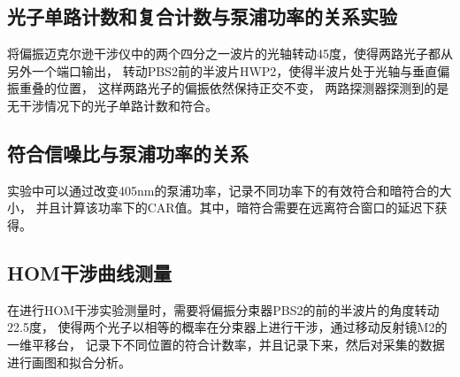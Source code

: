 \documentclass[a4paper,UTF8]{ctexart}
\begin{document}
\subsection{光子单路计数和复合计数与泵浦功率的关系实验}

将偏振迈克尔逊干涉仪中的两个四分之一波片的光轴转动45度，使得两路光子都从另外一个端口输出，
转动PBS2前的半波片HWP2，使得半波片处于光轴与垂直偏振重叠的位置，
这样两路光子的偏振依然保持正交不变，
两路探测器探测到的是无干涉情况下的光子单路计数和符合。

\subsection{符合信噪比与泵浦功率的关系}

实验中可以通过改变405nm的泵浦功率，记录不同功率下的有效符合和暗符合的大小，
并且计算该功率下的CAR值。其中，暗符合需要在远离符合窗口的延迟下获得。

\subsection{HOM干涉曲线测量}

在进行HOM干涉实验测量时，需要将偏振分束器PBS2的前的半波片的角度转动22.5度，
使得两个光子以相等的概率在分束器上进行干涉，通过移动反射镜M2的一维平移台，
记录下不同位置的符合计数率，并且记录下来，然后对采集的数据进行画图和拟合分析。
\end{document}
